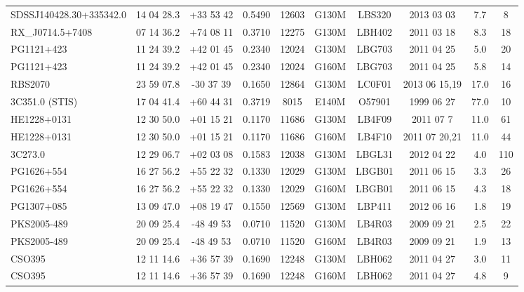 \documentclass[iop]{emulateapj-rtx4}
\begin{document}
\begin{table}[ht]
\begin{center}
\begin{tabular}{l c c c c c c c c c}
 SDSSJ140428.30+335342.0 	& 14 04 28.3  &  +33 53 42 &  0.5490  & 12603	 & G130M     & LBS320   & 2013 03 03   &     7.7 &  8  \\
 RX\_J0714.5+7408 			& 07 14 36.2  &  +74 08 11  &  0.3710 & 12275  & G130M     & LBH402   & 2011 03 18   &     8.3 &  18  \\
 PG1121+423 				& 11 24 39.2  &  +42 01 45  &  0.2340 & 12024	 & G130M     & LBG703   & 2011 04 25   &     5.0 & 20  \\
 PG1121+423 				& 11 24 39.2  &  +42 01 45  &  0.2340 & 12024	 & G160M     & LBG703   & 2011 04 25   &     5.8 & 14  \\
 RBS2070 				& 23 59 07.8  &  -30 37 39   &  0.1650 & 12864  & G130M     & LC0F01   & 2013 06 15,19  &   17.0 &  16  \\
 3C351.0 (STIS)                        & 17 04 41.4  &  +60 44 31  &  0.3719 &  8015   & E140M      & O57901   & 1999 06 27   &  77.0 &  10  \\
 HE1228+0131 			        & 12 30 50.0  &  +01 15 21  &  0.1170 & 11686   & G130M     & LB4F09   & 2011 07 7      &  11.0 &  61  \\
 HE1228+0131 			        & 12 30 50.0  &  +01 15 21  &  0.1170 & 11686   & G160M     & LB4F10   & 2011 07 20,21 &  11.0 &  44  \\
 3C273.0 					& 12 29 06.7  &  +02 03 08  &  0.1583 &12038   & G130M     & LBGL31  & 2012 04 22  &     4.0 &  110  \\
 PG1626+554 				& 16 27 56.2  &  +55 22 32  &  0.1330 & 12029  & G130M     & LBGB01  & 2011 06 15  &     3.3 &  26  \\
 PG1626+554 				& 16 27 56.2  &  +55 22 32  &  0.1330 & 12029  & G160M     & LBGB01  & 2011 06 15  &     4.3 &  18  \\
 PG1307+085 				& 13 09 47.0  &  +08 19 47  &  0.1550 & 12569 & G130M      & LBP411   & 2012 06 16  &     1.8 &  19  \\
 PKS2005-489 				& 20 09 25.4  &  -48 49 53   &  0.0710 & 11520 & G130M      & LB4R03   & 2009 09 21  &     2.5 &  22  \\
 PKS2005-489 				& 20 09 25.4  &  -48 49 53   &  0.0710 & 11520 & G160M      & LB4R03   & 2009 09 21  &     1.9 &  13  \\
 CSO395 					& 12 11 14.6  &  +36 57 39  &  0.1690 & 12248	& G130M      & LBH062   & 2011 04 27  &     3.0 &  11  \\
 CSO395 					& 12 11 14.6  &  +36 57 39  &  0.1690 & 12248	& G160M      & LBH062   & 2011 04 27  &     4.8 &  9  \\

\end{tabular}
\end{center}
\end{table}
\end{document}
